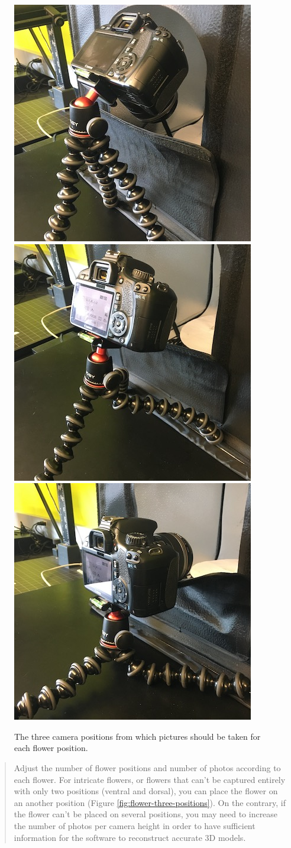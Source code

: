 \documentclass[
]{book}
\begin{document}
\begin{figure}

{\centering \includegraphics[width=0.33\linewidth]{Figures/camera_position_1} \includegraphics[width=0.33\linewidth]{Figures/camera_position_2} \includegraphics[width=0.33\linewidth]{Figures/camera_position_3} 

}

\caption{The three camera positions from which pictures should be taken for each flower position.}\label{fig:camera-positions}
\end{figure}

\begin{quote}
Adjust the number of flower positions and number of photos according to each flower. For intricate flowers, or flowers that can't be captured entirely with only two positions (ventral and dorsal), you can place the flower on an another position (Figure \ref{fig:flower-three-positions}). On the contrary, if the flower can't be placed on several positions, you may need to increase the number of photos per camera height in order to have sufficient information for the software to reconstruct accurate 3D models.
\end{quote}
\end{document}
